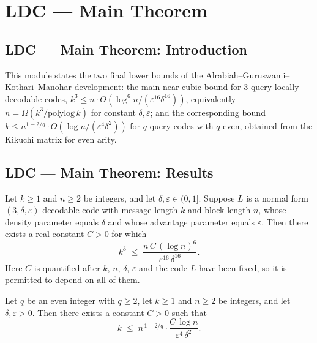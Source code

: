 \section{LDC --- Main Theorem}
\subsection*{LDC --- Main Theorem: Introduction}

This module states the two final lower bounds of the
Alrabiah--Guruswami--Kothari--Manohar development: the main near-cubic bound for
$3$-query locally decodable codes, $k^3 \le n \cdot O(\log^6 n / (\varepsilon^{16}
\delta^{16}))$, equivalently $n = \Omega(k^3 / \mathrm{polylog}\,k)$ for constant
$\delta, \varepsilon$; and the corresponding bound $k \le n^{1 - 2/q} \cdot O(\log n /
(\varepsilon^4 \delta^2))$ for $q$-query codes with $q$ even, obtained from the Kikuchi
matrix for even arity.

\subsection*{LDC --- Main Theorem: Results}

\begin{theorem}
\label{main_theorem_ldc_lower_bound}
\leanok
{}
Let $k \ge 1$ and $n \ge 2$ be integers, and let $\delta, \varepsilon \in (0,1]$.
Suppose $L$ is a normal form $(3,\delta,\varepsilon)$-decodable code with message length
$k$ and block length $n$, whose density parameter equals $\delta$ and whose advantage
parameter equals $\varepsilon$. Then there exists a real constant $C > 0$ for which
\[
  k^3 \;\le\; \frac{n \, C \, (\log n)^6}{\varepsilon^{16}\,\delta^{16}} .
\]
Here $C$ is quantified after $k$, $n$, $\delta$, $\varepsilon$ and the code $L$ have
been fixed, so it is permitted to depend on all of them.
\end{theorem}

\begin{theorem}
\label{even_q_ldc_lower_bound}
\leanok
{}
Let $q$ be an even integer with $q \ge 2$, let $k \ge 1$ and $n \ge 2$ be integers, and
let $\delta, \varepsilon > 0$. Then there exists a constant $C > 0$ such that
\[
  k \;\le\; n^{\,1 - 2/q}\cdot\frac{C \,\log n}{\varepsilon^{4}\,\delta^{2}}.
\]
\end{theorem}
